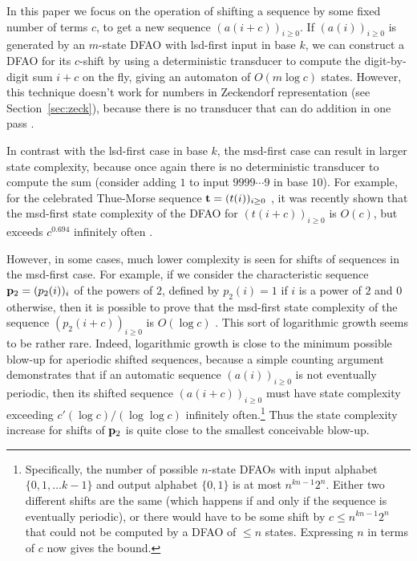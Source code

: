 \documentclass[12pt,runningheads]{llncs}
\begin{document}
In this paper we focus on the operation of shifting a sequence  by some fixed number of terms $c$, to get a new sequence $(a(i+c))_{i \geq 0}$.  If $(a(i))_{i \geq 0}$ is generated by an $m$-state DFAO with lsd-first input in base $k$, we can construct a DFAO for its $c$-shift by using a deterministic transducer to compute the digit-by-digit sum $i+c$ on the fly, giving an automaton of $O(m \log c)$ states. However, this technique doesn't work for numbers in Zeckendorf representation (see Section~\ref{sec:zeck}), because there is no transducer that can do addition in one pass \cite{Labbe&Lepsova:2023}.  

In contrast with the lsd-first case in base $k$, the msd-first case can result in larger state complexity, because once again there is no deterministic transducer to compute the sum (consider adding $1$ to input $9999\cdots 9$ in base $10$).  
For example, for the celebrated Thue-Morse sequence ${\bf t} = (t(i))_{i \geq 0}$ \cite{Allouche&Shallit:1999}, it was recently shown that the msd-first state complexity of the DFAO for
$(t(i+c))_{i \geq 0}$ is $O(c)$, but exceeds $c^{0.694}$ infinitely often \cite{Moradi&Rampersad&Shallit:2025}.

However, in some cases, much lower complexity is seen for shifts of sequences in the msd-first case.  For example, if we consider the characteristic sequence ${\bf p}_2=(p_2(i))_i$ of the powers of $2$, defined by
$p_2 (i) = 1$ if $i$ is a power of $2$ and $0$ otherwise,
then it is possible to prove that the msd-first state complexity of the sequence $(p_2(i+c))_{i \geq 0}$ is $O(\log c)$ \cite{Moradi&Rampersad&Shallit:2025}.  This sort of logarithmic growth seems to be rather rare.  Indeed, logarithmic growth is close to the minimum possible blow-up for aperiodic shifted sequences, because a simple counting argument demonstrates that if an automatic sequence $(a(i))_{i \geq 0}$ is not eventually periodic, then its shifted sequence $(a(i+c))_{i \geq 0}$ must have state complexity exceeding $c' (\log c)/(\log \log c)$ infinitely often.\footnote{Specifically, the number of possible $n$-state DFAOs with input alphabet $\{0,1,\ldots k-1\}$ and output alphabet $\{0,1\}$ is at most
$n^{kn-1} 2^n$.  Either two different shifts are the same (which happens if and only if the sequence is eventually periodic), or there would have to be some shift  by $c \leq n^{kn-1} 2^n$ that could not be computed by a DFAO of $\leq n$ states.  Expressing $n$ in terms of $c$ now gives the bound.}
Thus the state complexity increase for shifts of ${\bf p}_2$ is quite close to the smallest conceivable blow-up.
\end{document}
